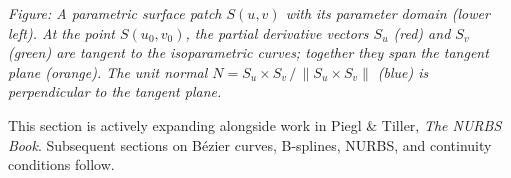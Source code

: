 \vspace{1em}
\begin{center}

\end{center}

\begin{center}
\small\itshape
Figure: A parametric surface patch $S(u,v)$ with its parameter domain (lower left).
At the point $S(u_0,v_0)$, the partial derivative vectors $S_u$ (red) and $S_v$ (green)
are tangent to the isoparametric curves; together they span the tangent plane (orange).
The unit normal $N = S_u \times S_v\,/\,\|S_u \times S_v\|$ (blue) is perpendicular
to the tangent plane.
\end{center}

\vspace{1em}
\begin{tcolorbox}[
  colback=gray!6, colframe=gray!40, arc=2pt,
  left=8pt, right=8pt, top=6pt, bottom=6pt,
  title={\small\textbf{Status: Active}},
  fonttitle=\small\bfseries
]
\noindent This section is actively expanding alongside work in Piegl \& Tiller,
\textit{The NURBS Book}.
Subsequent sections on B\'{e}zier curves, B-splines, NURBS, and continuity
conditions follow.
\end{tcolorbox}
